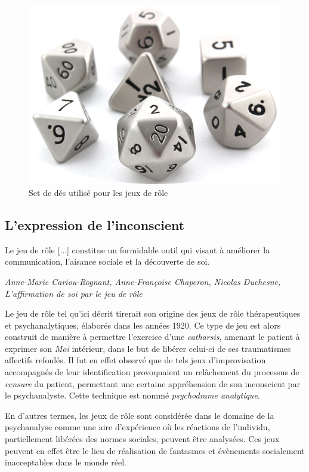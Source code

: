 \begin{figure}[h!]
    \centering
    \includegraphics[width=0.80\linewidth]{img/dice_set.png}
    \caption{Set de dés utilisé pour les jeux de rôle}
\end{figure}

\clearpage


\subsection{L'expression de l'inconscient}

\begin{shadequote}
Le jeu de rôle [...] constitue un formidable outil qui visant à améliorer la communication, l'aisance sociale et la découverte de soi.
\par\emph{Anne-Marie Cariou-Rognant, Anne-Françoise Chaperon, Nicolas Duchesne, L'affirmation de soi par le jeu de rôle}
\end{shadequote}

Le jeu de rôle tel qu'ici décrit tirerait son origine des jeux de rôle thérapeutiques et psychanalytiques, élaborés dans les années 1920. Ce type de jeu est alors construit de manière à permettre l'exercice d'une \textit{catharsis}, amenant le patient à exprimer son \textit{Moi} intérieur, dans le but de libérer celui-ci de ses traumatismes affectifs refoulés. Il fut en effet observé que de tels jeux d'improvisation accompagnés de leur identification provoquaient un relâchement du processus de \textit{censure} du patient, permettant une certaine appréhension de son inconscient par le psychanalyste. Cette technique est nommé \textit{psychodrame analytique}.

En d'autres termes, les jeux de rôle sont considérée dans le domaine de la psychanalyse comme une aire d'expérience où les réactions de l'individu, partiellement libérées des normes sociales, peuvent être analysées. Ces jeux peuvent en effet être le lieu de réalisation de fantasmes et évènements socialement inacceptables dans le monde réel.\\


